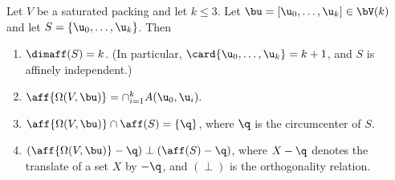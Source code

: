 \begin{lemma}[]\label{lemma:aff-center} 
Let $V$ be a saturated packing and let $k\le 3$.
Let $\bu=[\u_0,\ldots,\u_k]\in \bV(k)$ and let $S = \{\u_0,\ldots,\u_k\}$.
Then
\begin{enumerate} 
\item $\dimaff (S)= k$.  (In particular, $\card\{\u_0,\ldots,\u_k\}=k+1$, and
$S$ is affinely independent.)
\item $\aff{\Omega(V,\bu)}= \cap_{i=1}^k A(\u_0,\u_i).$
\item $\aff{\Omega(V,\bu)} \cap \aff(S) = \{\q\}$, 
where $\q$ is the circumcenter of $S$.
\item $(\aff{\Omega(V,\bu)}-\q) \perp (\aff(S)-\q)$, where
  $X-\q$ denotes the translate of a set $X$ by $-\q$, and $(\perp)$ is
  the orthogonality relation.
\end{enumerate}
\end{lemma}


